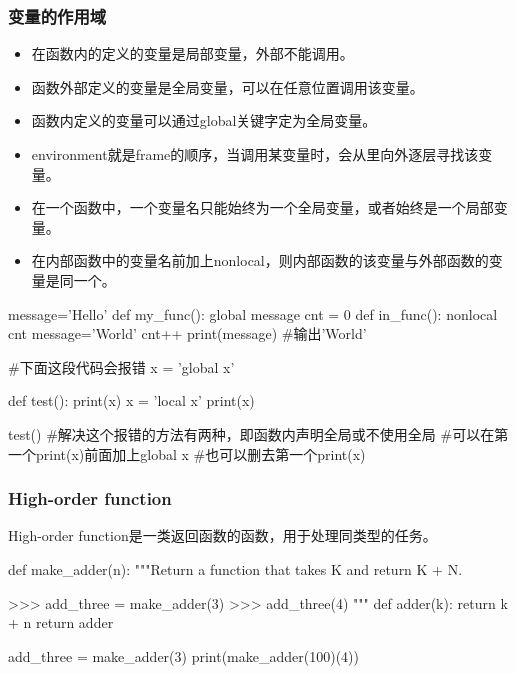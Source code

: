     \subsubsection{变量的作用域}
      \begin{itemize}
        \item 在函数内的定义的变量是局部变量，外部不能调用。
        \item 函数外部定义的变量是全局变量，可以在任意位置调用该变量。
        \item 函数内定义的变量可以通过global关键字定为全局变量。
        \item environment就是frame的顺序，当调用某变量时，会从里向外逐层寻找该变量。
        \item 在一个函数中，一个变量名只能始终为一个全局变量，或者始终是一个局部变量。
        \item 在内部函数中的变量名前加上nonlocal，则内部函数的该变量与外部函数的变量是同一个。
      \end{itemize}

      \begin{codeblock}[language=python, caption={local and global}]
        message='Hello'
        def my_func():
          global message
          cnt = 0
          def in_func():
            nonlocal cnt
          message='World'
          cnt++
        print(message) #输出'World'

        #下面这段代码会报错
        x = 'global x'

        def test():
          print(x)
          x = 'local x'
          print(x)
        
        test()
        #解决这个报错的方法有两种，即函数内声明全局或不使用全局
        #可以在第一个print(x)前面加上global x
        #也可以删去第一个print(x)
      \end{codeblock}

    \subsubsection{High-order function}
      High-order function是一类返回函数的函数，用于处理同类型的任务。
      \begin{codeblock}[language=python, caption={High-order function}]
        def make_adder(n):
          """Return a function that takes K and return K + N.

          >>> add_three = make_adder(3)
          >>> add_three(4)
          """
          def adder(k):
            return k + n
          return adder

        add_three = make_adder(3)
        print(make_adder(100)(4))
      \end{codeblock}

